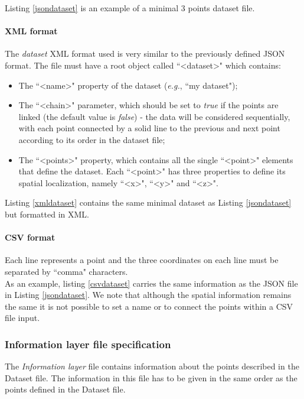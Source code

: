 \documentclass[10pt]{bmc_article}
\newenvironment{bmcformat}{\baselineskip20pt\sloppy\setboolean{publ}{false}}{\baselineskip20pt\sloppy}
\begin{document}
\begin{bmcformat}
Listing \ref{jsondataset} is an example of a minimal 3 points dataset file.

\paragraph{XML format}
The {\it{dataset}} XML format used is very similar to the previously defined JSON format. The file must have a root object called ``\textless dataset\textgreater " which contains: \begin{itemize}
\item{The ``\textless name\textgreater " property of the dataset (\textit{e.g.}, ``my dataset");}
\item{The ``\textless chain\textgreater " parameter, which should be set to \textit{true} if the points are linked (the default value is \textit{false}) - the data will be considered sequentially, with each point connected by a solid line to the previous and next point according to its order in the dataset file;}
\item{The ``\textless points\textgreater " property, which contains all the single ``\textless point\textgreater " elements that define the dataset. Each ``\textless point\textgreater " has three properties to define its spatial localization, namely ``\textless x\textgreater ", ``\textless y\textgreater " and ``\textless z\textgreater ".}
\end{itemize}

Listing \ref{xmldataset} contains the same minimal dataset as Listing \ref{jsondataset} but formatted in XML.

\paragraph{CSV format}
Each line represents a point and the three coordinates on each line must be separated by ``comma" characters.\\As an example, listing \ref{csvdataset} carries the same information as the JSON file in Listing \ref{jsondataset}. We note that although the spatial information remains the same it is not possible to set a name or to connect the points within a CSV file input.



\subsubsection{Information layer file specification}The {\it{Information layer}} file contains information about the points described in the Dataset file. The information in this file has to be given in the same order as the points defined in the Dataset file.


\end{bmcformat}
\end{document}
